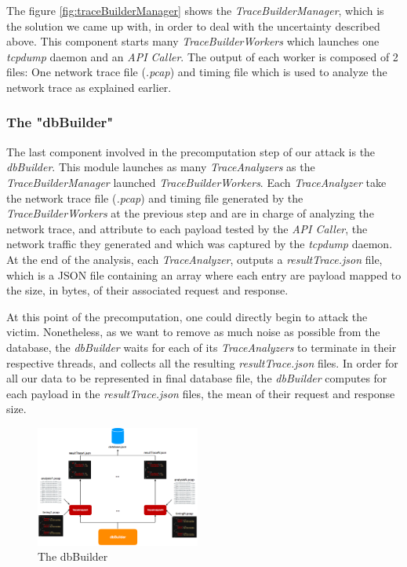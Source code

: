 \documentclass[journal]{IEEEtran}
\begin{document}
The figure \ref{fig:traceBuilderManager} shows the \emph{TraceBuilderManager}, which is the solution we came up with, in order to deal with the uncertainty described above. This component starts many \emph{TraceBuilderWorkers} which launches one \emph{tcpdump} daemon and an \emph{API Caller}. The output of  each worker is composed of 2 files: One network trace file (\emph{.pcap}) and timing file which is used to analyze the network trace as explained earlier.

\bigskip

\subsubsection*{The "dbBuilder"}

The last component involved in the precomputation step of our attack is the \emph{dbBuilder}. This module launches as many \emph{TraceAnalyzers} as the \emph{TraceBuilderManager} launched \emph{TraceBuilderWorkers}.
Each \emph{TraceAnalyzer} take the network trace file (\emph{.pcap}) and timing file generated by the \emph{TraceBuilderWorkers} at the previous step and are in charge of analyzing the network trace, and attribute to each payload tested by the \emph{API Caller}, the network traffic they generated and which was captured by the \emph{tcpdump} daemon. At the end of the analysis, each \emph{TraceAnalyzer}, outputs a \emph{resultTrace.json} file, which is a JSON file containing an array where each entry are payload mapped to the size, in bytes, of their associated request and response.

\medskip

At this point of the precomputation, one could directly begin to attack the victim. Nonetheless, as we want to remove as much noise as possible from the database, the \emph{dbBuilder} waits for each of its \emph{TraceAnalyzers} to terminate in their respective threads, and collects all the resulting \emph{resultTrace.json} files. In order for all our data to be represented in final database file, the \emph{dbBuilder} computes for each payload in the \emph{resultTrace.json} files, the mean of their request and response size. 

\begin{figure}[h]
\centering
\includegraphics[width=0.48\textwidth]{images/dbBuilder.png}
\caption{The dbBuilder}
\label{fig:dbBuilder}
\end{figure}
\end{document}
